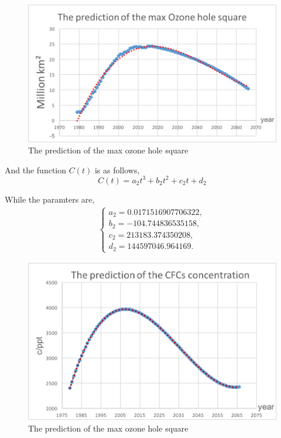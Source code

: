 \documentclass[12pt]{article}
\begin{document}
\begin{center}
\begin{figure}[htpb]
\centering
\includegraphics[scale=0.6]{pre}
\caption{The prediction of the max ozone hole square}\label{fig:xgx}
\end{figure}
\end{center}

And the function $C(t)$ is as follows,
$$
C(t) = a_2 t^3 + b_2 t^2 + c_2 t + d_2
$$

While the paramters are,
\begin{eqnarray}
\left \{
  \begin{array}{ll}
  a_2 = 0.0171516907706322, \\
  b_2 = -104.744836535158, \\
  c_2 = 213183.374350208, \\
  d_2 = 144597046.964169.
 
\end{array} \right .
\end{eqnarray}

\begin{center}
\begin{figure}[htpb]
\centering
\includegraphics[scale=0.5]{pre2}
\caption{The prediction of the max ozone hole square}\label{fig:xgx}
\end{figure}
\end{center}
\end{document}
